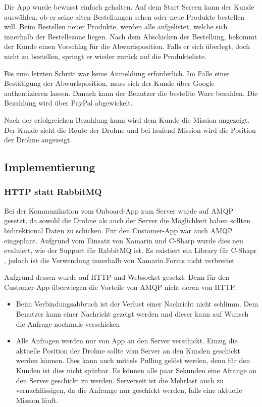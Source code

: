 Die App wurde bewusst einfach gehalten.
Auf dem Start Screen kann der Kunde auswählen, ob er seine alten Bestellungen sehen oder neue Produkte bestellen will.
Beim Bestellen neuer Produkte, werden alle aufgelistet, welche sich innerhalb der Bestellezone liegen.
Nach dem Abschicken der Bestellung, bekommt der Kunde einen Vorschlag für die Abwurfsposition.
Falls er sich überlegt, doch nicht zu bestellen, springt er wieder zurück auf die Produkteliste.

Bis zum letzten Schritt war keine Anmeldung erforderlich.
Im Falle einer Bestätigung der Abwurfsposition, muss sich der Kunde über Google authentizieren lassen.
Danach kann der Benutzer die bestellte Ware bezahlen.
Die Bezahlung wird über PayPal abgewickelt.

Nach der erfolgreichen Bezahlung kann wird dem Kunde die Mission angezeigt.
Der Kunde sieht die Route der Drohne und bei laufend Mission wird die Position der Drohne angezeigt.

\subsection{Implementierung}

\subsubsection{HTTP statt RabbitMQ}
Bei der Kommunikation vom Onboard-App zum Server wurde auf AMQP gesetzt, da sowohl die Drohne als auch der Server die Möglichkeit haben sollten bidirektional Daten zu schicken. 
Für den Customer-App war auch AMQP eingeplant. Aufgrund vom Einsatz von Xamarin und C-Sharp wurde dies neu evaluiert, wie der Support für RabbitMQ ist.
Es existiert ein Library für C-Shapr \cite{easynetq}, jedoch ist die Verwendung innerhalb von Xamarin.Forms nicht verbreitet \cite{amqp-csharp}. 

Aufgrund dessen wurde auf HTTP und Websocket gesetzt.
Denn für den Customer-App überwiegen die Vorteile von AMQP nicht deren von HTTP:
\begin{itemize}
	\item{
	Beim Verbindungsabbruch ist der Verlust einer Nachricht nicht schlimm.
	Dem Benutzer kann einer Nachricht gezeigt werden und dieser kann auf Wunsch die Anfrage nochmals verschicken}
	\item{
	    Alle Anfragen werden nur von App an den Server verschickt.
	    Einzig die aktuelle Position der Drohne sollte vom Server an den Kunden geschickt werden können.
	    Dies kann auch mittels Pulling gelöst werden, denn für den Kunden ist dies nicht spürbar.
	    Es können alle paar Sekunden eine Afrange an den Server geschickt zu werden.
	    Serverseit ist die Mehrlast auch zu vernachlässigen, da die Anfrange nur geschickt werden,
	    falls eine aktuelle Mission läuft.
	}
\end{itemize}

